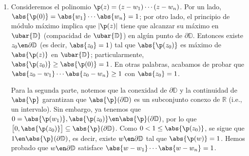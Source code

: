 \begin{sol}
\begin{enumerate}[label=(\alph*),leftmargin=1.5em]
\begin{equation}\label{eq:cotaunif}
\sup_{z\en S_k,\abs{z} = r} \abs{F(z)}  
\;\;\leq\;\; M^{\mathrlap{m-1}} \;\;\sup_{z\en S_k,\abs{z} = r} \abs{f_k(z)} 
\;\;\xrightarrow{r \to 1}\;\; 0
\end{equation}
el lado derecho de (\ref{eq:cotaunif}) converge a cero ya que $f_k \xrightarrow{\abs{z} \to 1} 0$ uniformemente en $S_k$. En consecuencia, gracias a que $\mathbb{D} = \bigcup^{m-1}_{k=0}S_k$, la convergencia de (\ref{eq:cotaunif}) implica: 
\[
\sup_{\abs{z} = r} \abs{F(z)}  
\;\;=\;\; \adjustlimits\max_{0\le k < m\,} \sup_{z\en S_k,\abs{z} = r} \abs{F(z)}
\;\;\xrightarrow{r \to 1}\;\; 0
\]
Esto demuestra que $F \xrightarrow{\abs{z}\to1}0$ uniformemente en todo $\mathbb{D}$.\par
Finalmente, al fijar un $0 < r_0 < 1$, el principio de módulo máximo garantiza para $r_0<r<1$:
\[
\sup_{\abs{z} < r_0} \abs{F(z)}
\;\le\; \sup_{\abs{z} < r} \abs{F(z)}
\;=\; \sup_{\abs{z} = r} \abs{F(z)}
\]
Al tomar límite cuando $r\to1$, obtenemos que $\sup_{\abs{z} < r_0} \abs{F(z)} = 0$, por lo que $F$ es nula en $D_{r_0}(0)$. El principio de identidad garantiza entonces que $F$ es idénticamente cero. La única forma de que un producto de funciones holomorfas sea nulo, es que alguna de ellas sea nula, i.e., existe $k\en\set{0,\dots,m-1}$ tal que $f_k=0$, pero esto implica que $f(z) = f_k(z\omega^k) = 0$. Hemos demostrado que $f$ es nula.
\item %
Consideremos el polinomio $\p(z) = (z-w_1)\cdots(z-w_n)$. Por un lado, $\abs{\p(0)} = \abs{w_1}\cdots\abs{w_n} = 1$; por otro lado, el principio de módulo máximo implica que $|\p(z)|$ tiene que alcanzar su máximo en $\ubar{\mathbb{D}}$ (compacidad de $\ubar{\mathbb{D}}$) en algún punto de $\partial\mathbb{D}$. Entonces existe $z_0\en\partial\mathbb{D}$ (es decir, $\abs{z_0} = 1$) tal que $\abs{\p(z_0)}$ es máximo de $\abs{\p(z)}$ en $\ubar{\mathbb{D}}$; particularmente, $\abs{\p(z_0)} \ge \abs{\p(0)} = 1$. En otras palabras, acabamos de probar que $\abs{z_0-w_1} \cdots\abs{z_0-w_n} \ge 1$ con $\abs{z_0} = 1$.\par
Para la segunda parte, notemos que la conexidad de $\partial\mathbb{D}$ y la continuidad de $\abs{\p}$ garantizan que $\abs{\p}(\partial\mathbb{D})$ es un subconjunto conexo de $\mathbb{R}$ (i.e., un intervalo). Sin embargo, ya tenemos que $0=\abs{\p(w_1)},\abs{\p(z_0)}\en\abs{\p}(\partial\mathbb{D})$, por lo que $\big[0,\abs{\p(z_0)}\big] \subseteq \abs{\p}(\partial\mathbb{D})$. Como $0<1\le \abs{\p(z_0)}$, se sigue que $1 \en \abs{\p}(\partial\mathbb{D})$, es decir, existe $w\en \partial\mathbb{D}$ tal que $\abs{\p(w)} = 1$. Hemos probado que $w\en\partial\mathbb{D}$ satisface $\abs{w-w_1} \cdots\abs{w-w_n} = 1$.

\end{enumerate}
\end{sol}
